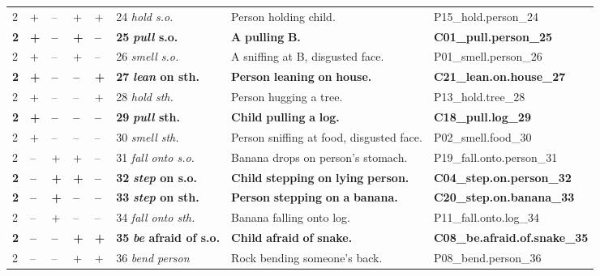 \begin{tabular}{llllllp{3cm}l}
\midrule
2 		& + 		& -- 		& + 		& + 		& 24 		\textit{hold s.o.} &Person holding child. 					& P15\_hold.person\_24 \\
\textbf{2} 	& \textbf{+} 	& \textbf{--} & \textbf{+} 	& \textbf{--} 	& \textbf{25} 	\textbf{\textit{pull} \textbf{s.o.}} &\textbf{A} \textbf{pulling} \textbf{B.} &  \textbf{C01\_pull.person\_25}  \\
2 		& + 		& -- 		& + 		& -- 		& 26 		\textit{smell s.o.} &A sniffing at B, disgusted face. 				& P01\_smell.person\_26 \\
\textbf{2} 	& \textbf{+} 	& \textbf{--} & \textbf{--} & \textbf{+} & \textbf{27} 	\textbf{\textit{lean} \textbf{on} \textbf{sth.}}& \textbf{Person} \textbf{leaning} \textbf{on} \textbf{house.} & \textbf{C21\_lean.on.house\_27} \\
2 		& + 		& -- 		& -- 		& + 		& 28 		\textit{hold sth.} &Person hugging a tree.					 & P13\_hold.tree\_28 \\
\textbf{2} 	& \textbf{+} 	& \textbf{--} & \textbf{--}& \textbf{--} 	& \textbf{29} 	\textbf{\textit{pull} \textbf{sth.}} &\textbf{Child} \textbf{pulling} \textbf{a} \textbf{log.} & \textbf{C18\_pull.log\_29} \\
2 		& + 		& -- 		& -- 		& -- 		& 30 		\textit{smell sth.} &Person sniffing at food, disgusted face. & P02\_smell.food\_30 \\
2 		& -- 	& + 		& + 		& -- 		& 31 		\textit{fall onto s.o.} &Banana drops on person's stomach.			 & P19\_fall.onto.person\_31  \\
\textbf{2} 	& \textbf{--}& \textbf{+}& \textbf{+} 	& \textbf{--} 	& \textbf{32} 	\textbf{\textit{step} \textbf{on} \textbf{s.o.}}& \textbf{Child} \textbf{stepping} \textbf{on} \textbf{lying} \textbf{person.} & \textbf{C04\_step.on.person\_32}  \\
\textbf{2} 	& \textbf{--}& \textbf{+}& \textbf{--}& \textbf{--} 	& \textbf{33} 	\textbf{\textit{step} \textbf{on} \textbf{sth.}}& \textbf{Person} \textbf{stepping} \textbf{on} \textbf{a} \textbf{banana.} & \textbf{C20\_step.on.banana\_33} \\
2 		& -- 	& + 		& -- 		& -- 		& 34 		\textit{fall onto sth.}& Banana falling onto log.				&  P11\_fall.onto.log\_34  \\
\textbf{2} 	& \textbf{--}& \textbf{--}& \textbf{+} 	& \textbf{+} & \textbf{35} 	\textbf{\textit{be} \textbf{afraid} \textbf{of} \textbf{s.o.}} &\textbf{Child} \textbf{afraid} \textbf{of} \textbf{snake.} & \textbf{C08\_be.afraid.of.snake\_35} \\
2 		& -- 	& -- 		& + 		& + 		& 36 		\textit{bend person}& Rock bending someone's back. 				& P08\_bend.person\_36  \\

\end{tabular}
